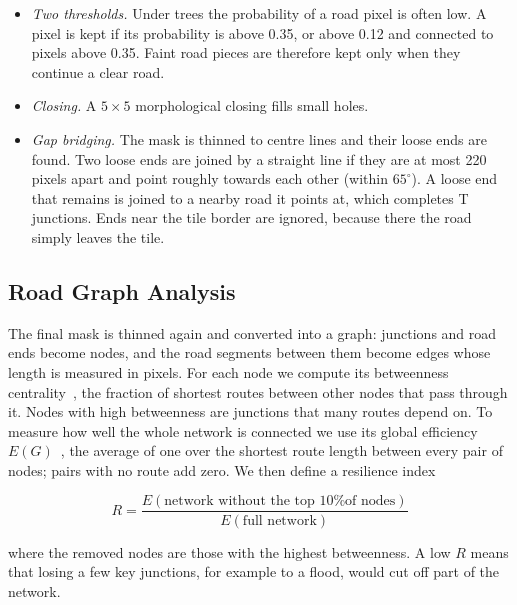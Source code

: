\documentclass{ieeeaccess}
\begin{document}
\begin{itemize}

\item \emph{Two thresholds.} Under trees the probability of a road pixel is often low. A pixel is kept if its probability is above 0.35, or above 0.12 and connected to pixels above 0.35. Faint road pieces are therefore kept only when they continue a clear road.

\item \emph{Closing.} A $5 \times 5$ morphological closing fills small holes.

\item \emph{Gap bridging.} The mask is thinned to centre lines and their loose ends are found. Two loose ends are joined by a straight line if they are at most 220 pixels apart and point roughly towards each other (within $65^{\circ}$). A loose end that remains is joined to a nearby road it points at, which completes T junctions. Ends near the tile border are ignored, because there the road simply leaves the tile.

\end{itemize}

\subsection{Road Graph Analysis}

The final mask is thinned again and converted into a graph: junctions and road ends become nodes, and the road segments between them become edges whose length is measured in pixels. For each node we compute its betweenness centrality~\cite{freeman1977betweenness}, the fraction of shortest routes between other nodes that pass through it. Nodes with high betweenness are junctions that many routes depend on. To measure how well the whole network is connected we use its global efficiency $E(G)$~\cite{latora2001efficient}, the average of one over the shortest route length between every pair of nodes; pairs with no route add zero. We then define a resilience index

\begin{equation}
R = \frac{E(\text{network without the top 10\% of nodes})}{E(\text{full network})}
\label{eq:resilience}
\end{equation}

where the removed nodes are those with the highest betweenness. A low $R$ means that losing a few key junctions, for example to a flood, would cut off part of the network.
\end{document}
